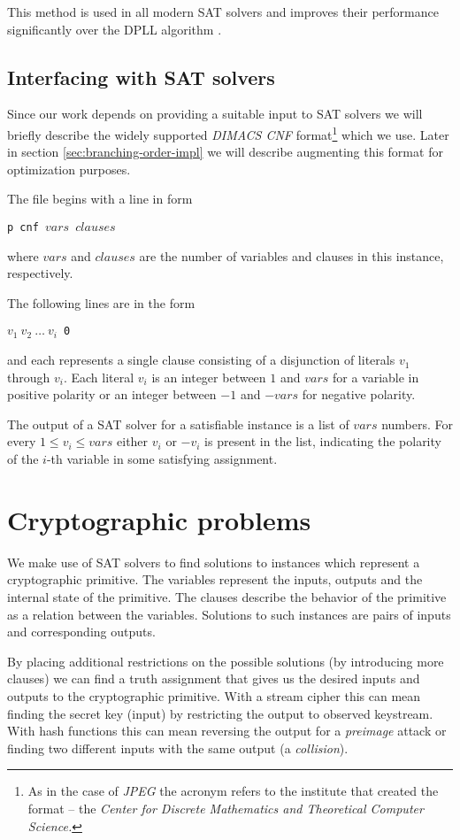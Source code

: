 This method is used in all modern SAT solvers and improves their performance significantly over the DPLL algorithm \cite{silva1997grasp}.

\subsection{Interfacing with SAT solvers}
\label{sec:dimacs}
Since our work depends on providing a suitable input to SAT solvers we will briefly describe the widely supported \emph{DIMACS CNF} format\footnote{As in the case of \emph{JPEG} the acronym refers to the institute that created the format -- the \emph{Center for Discrete Mathematics and Theoretical Computer Science.}} which we use.
Later in section \ref{sec:branching-order-impl} we will describe augmenting this format for optimization purposes.

The file begins with a line in form

\centerline{\texttt{p cnf $vars$ $clauses$}}

\noindent where $vars$ and $clauses$ are the number of variables and clauses in this instance, respectively.

The following lines are in the form

\centerline{\texttt{$v_1 ~ v_2 ~ \ldots ~ v_i$ 0}}

\noindent and each represents a single clause consisting of a disjunction of literals $v_1$ through $v_i$.
Each literal $v_i$ is an integer between $1$ and $vars$ for a variable in positive polarity or an integer between $-1$ and $-vars$ for negative polarity.

The output of a SAT solver for a satisfiable instance is a list of $vars$ numbers.
For every $1 \le v_i \le vars$ either $v_i$ or $-v_i$ is present in the list, indicating the polarity of the $i$-th variable in some satisfying assignment. 

\section{Cryptographic problems}
We make use of SAT solvers to find solutions to instances which represent a cryptographic primitive.
The variables represent the inputs, outputs and the internal state of the primitive.
The clauses describe the behavior of the primitive as a relation between the variables.
Solutions to such instances are pairs of inputs and corresponding outputs.

By placing additional restrictions on the possible solutions (by introducing more clauses) we can find a truth assignment that gives us the desired inputs and outputs to the cryptographic primitive.
With a stream cipher this can mean finding the secret key (input) by restricting the output to observed keystream.
With hash functions this can mean reversing the output for a \emph{preimage} attack or finding two different inputs with the same output (a \emph{collision}).

